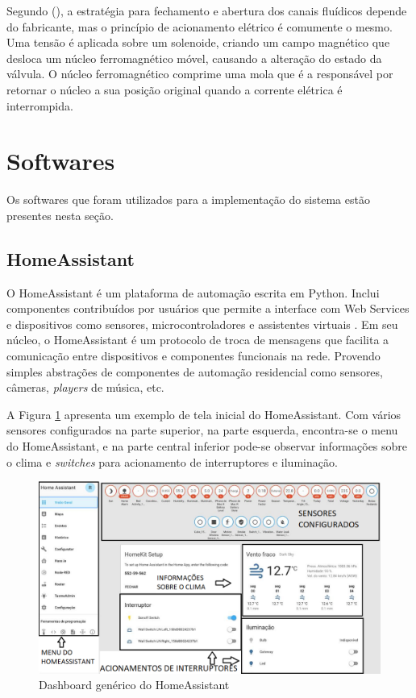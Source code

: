 Segundo \citeauthor{da2002modulo} (\citeyear{da2002modulo}), a estratégia para fechamento e abertura dos canais fluídicos depende do fabricante, mas o princípio de acionamento elétrico é comumente o mesmo. Uma tensão é aplicada sobre um solenoide, criando um campo magnético que desloca um núcleo ferromagnético móvel, causando a alteração do estado da válvula. O núcleo
ferromagnético comprime uma mola que é a responsável por retornar o núcleo a sua posição original quando a corrente elétrica é interrompida.

\section{Softwares}

Os softwares que foram utilizados para a implementação do sistema estão presentes nesta seção.

\subsection{HomeAssistant}

O HomeAssistant é um plataforma de automação escrita em Python. Inclui componentes contribuídos por usuários que permite a interface com Web Services e dispositivos como sensores, microcontroladores e assistentes virtuais \cite{Lundrigan2017}. Em seu núcleo, o HomeAssistant é um protocolo de troca de mensagens que facilita a comunicação entre dispositivos e componentes funcionais na rede. Provendo simples abstrações de componentes de automação residencial como sensores, câmeras, \textit{players} de música, etc.

A Figura \ref{fig:homeassistant-dash} apresenta um exemplo de tela inicial do HomeAssistant. Com vários sensores configurados na parte superior, na parte esquerda, encontra-se o menu do HomeAssistant, e na parte central inferior pode-se observar informações sobre o clima e \textit{switches} para acionamento de interruptores e iluminação.

\begin{figure}[htbp]
	\centering
	\includegraphics[width=1\linewidth]{figuras/homeassistant-dash.png}
	\caption{Dashboard genérico do HomeAssistant}
	\label{fig:homeassistant-dash}
\end{figure}

